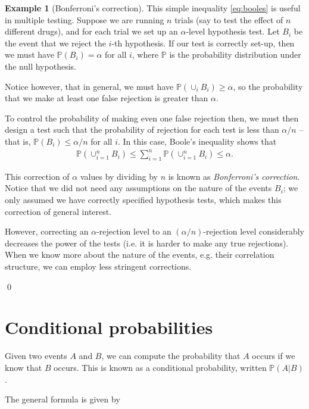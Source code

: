 \documentclass[11pt]{article}
\theoremstyle{definition}
\newtheorem{example}[theorem]{Example}
\renewcommand{\P}{\mathbb{P}}
\begin{document}
\begin{example}[Bonferroni's correction]
This simple inequality \eqref{eq:booles} is useful in multiple testing.
Suppose we are running $n$ trials (say to test the effect of $n$ different drugs),
and for each trial we set up an $\alpha$-level
hypothesis test.
Let $B_i$ be the event that we reject the $i$-th hypothesis.
If our test is correctly set-up, then we must have $\P(B_i) = \alpha$ for all $i$,
where $\P$ is the probability distribution under the null hypothesis.

Notice however, that in general, we must have $\P(\cup_i B_i) \geq \alpha$,
so the probability that we make at least one false rejection is greater than $\alpha$.

To control the probability of making even one false rejection then, we must then design
a test such that the probability of rejection for each test is less than $\alpha / n$ --
that is, $\P(B_i) \leq \alpha / n$ for all $i$. In this case,
Boole's inequality shows that
\begin{align*}
  \P(\cup_{i=1}^n B_i) \leq \sum_{i=1}^{n} \P(\cup_{i = 1}^n B_i)
  \leq \alpha.
\end{align*}

This correction of $\alpha$ values by dividing by $n$ is known as \textit{Bonferroni's correction}.
Notice that we did not need any assumptions on the nature of the events $B_i$;
we only assumed we have correctly specified hypothesis tests, which makes this
correction of general interest.

However, correcting an $\alpha$-rejection level to an $(\alpha / n)$-rejection level
considerably decreases the power of the tests (i.e. it is harder to make any true rejections).
When we know more about the nature of the events, e.g. their correlation structure,
we can employ less stringent corrections.

\qed
\end{example}

\section{Conditional probabilities}

Given two events $A$ and $B$, we can compute the probability that $A$ occurs
if we know that $B$ occurs. This is known as a conditional probability,
written $\P(A | B)$.

The general formula is given by

\fbox{\begin{minipage}{\textwidth}
\vspace{-1em}
\begin{align}
  \P(A | B) = \frac{\P(A \cap B)}{\P(B)}.
  \label{eq:conditional_prob}
\end{align}
\end{minipage}}
\end{document}
